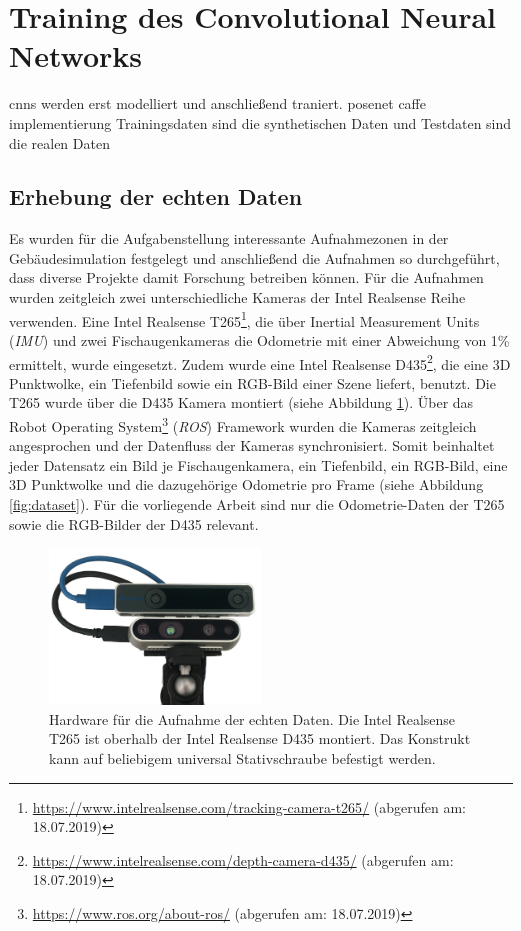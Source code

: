 \newpage
\section{Training des Convolutional Neural Networks}
cnns werden erst modelliert und anschließend traniert.
posenet caffe implementierung
Trainingsdaten sind die synthetischen Daten und Testdaten sind die realen Daten

\subsection{Erhebung der echten Daten}
Es wurden für die Aufgabenstellung interessante Aufnahmezonen in der Gebäudesimulation festgelegt und anschließend die Aufnahmen so durchgeführt, dass diverse Projekte damit Forschung betreiben können.  Für die Aufnahmen wurden zeitgleich zwei unterschiedliche Kameras der Intel Realsense Reihe verwenden. Eine Intel Realsense T265\footnote{\url{https://www.intelrealsense.com/tracking-camera-t265/} (abgerufen am: 18.07.2019)}, die über Inertial Measurement Units (\textit{IMU}) und zwei Fischaugenkameras die Odometrie mit einer Abweichung von 1\% ermittelt, wurde eingesetzt. Zudem wurde eine Intel Realsense D435\footnote{ \url{https://www.intelrealsense.com/depth-camera-d435/} (abgerufen am: 18.07.2019)}, die eine 3D Punktwolke, ein Tiefenbild sowie ein RGB-Bild einer Szene liefert, benutzt. Die T265 wurde über die D435 Kamera montiert (siehe Abbildung \ref{fig:t265_d435}). Über das Robot Operating System\footnote{\url{https://www.ros.org/about-ros/} (abgerufen am: 18.07.2019)} (\textit{ROS}) Framework wurden die Kameras zeitgleich angesprochen und der Datenfluss der Kameras synchronisiert. Somit beinhaltet jeder Datensatz ein Bild je Fischaugenkamera, ein Tiefenbild, ein RGB-Bild, eine 3D Punktwolke und die dazugehörige Odometrie pro Frame (siehe Abbildung \ref{fig:dataset}). Für die vorliegende Arbeit sind nur die Odometrie-Daten der T265 sowie die RGB-Bilder der D435 relevant.


\begin{figure}[htp]
	\centering
	\includegraphics[width=0.5\textwidth]{images/dataset/t265_d435.png}
	\caption{Hardware für die Aufnahme der echten Daten. Die Intel Realsense T265 ist oberhalb der Intel Realsense D435 montiert. Das Konstrukt kann auf beliebigem universal Stativschraube befestigt werden.  }
	\label{fig:t265_d435}
\end{figure}


